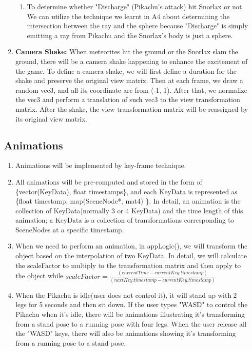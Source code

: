 \documentclass {article}
\begin{document}
\begin{enumerate}
\begin{enumerate}
        \item To determine whether "Discharge" (Pikachu's attack) hit Snorlax or not. We can utilize the technique we learnt in A4 about determining the intersection between the ray and the sphere because 
        "Discharge" is simply emitting a ray from Pikachu and the Snorlax's body is just a sphere.
    \end{enumerate}
    \item  \textbf{Camera Shake:}
    When meteorites hit the ground or the Snorlax slam the ground, there will be a camera shake happening to enhance the excitement of the game.
    To define a camera shake, we will first define a duration for the shake and preserve the original view matrix. 
    Then at each frame, we draw a random vec3, and all its coordinate are from (-1, 1). After that, we normalize the vec3 and perform a translation of
    such vec3 to the view transformation matrix. After the shake, the view transformation matrix will be reassigned by its original view matrix.
    \end{enumerate}

     \subsection{Animations}
     \begin{enumerate}
        \item Animations will be implemented by key-frame technique.
        \item All animations will be pre-computed and stored in the form of \{vector(KeyData), float timestamps\}, and each KeyData 
        is represented as \{float timestamp, map(SceneNode*, mat4) \}. In detail, an animation is the collection of KeyData(normally 3 or 4 KeyData) and the time length
        of this animation; a KeyData is a collection of transformations corresponding to SceneNodes at a specific timestamp.
        \item When we need to perform an animation, in appLogic(), we will transform the object based on the interpolation of two KeyData. In detail,
        we will calculate the scaleFactor to multiply to the transformation matrix and then apply to the object while $scaleFactor = \frac{(currentTime-currentKey.timestamp)}{(nextKey.timestamp-currentKey.timestamp)}$
        \item When the Pikachu is idle(user does not control it), it will stand up with 2 legs for 5 seconds and then sit down. If the user types "WASD" to control the Pikachu when it's idle,
        there will be animations illustrating it's transforming from a stand pose to a running pose with four legs. When the user release all the "WASD" keys, there will also be animations
        showing it's transforming from a running pose to a stand pose.
     \end{enumerate}
     
\end{document}
